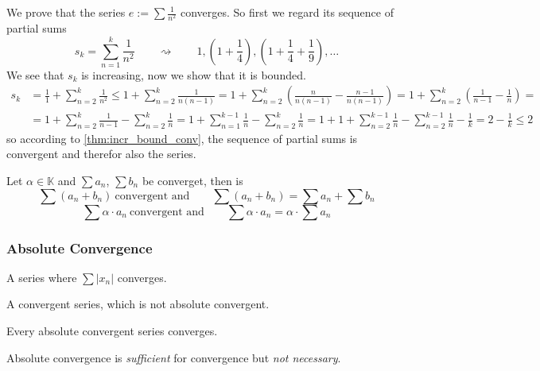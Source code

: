 \begin{example}
   We prove that the series \(e := \sum \frac{1}{n^2}\) converges.
   So first we regard its sequence of partial sums
   \[s_k = \sum_{n=1}^k \frac{1}{n^2} \qquad\rightsquigarrow\qquad 1, \left(1 + \frac{1}{4}\right),  \left(1 + \frac{1}{4} + \frac{1}{9}\right), \ldots\]
   We see that \(s_k\) is increasing, now we show that it is bounded.
   \begin{equation*}
      \begin{split}
         s_k & = \frac{1}{1} + \sum_{n=2}^k \frac{1}{n^2} \leq 1 + \sum_{n=2}^k \frac{1}{n(n-1)} = 1 + \sum_{n=2}^k \left(\frac{n}{n(n-1)} - \frac{n-1}{n(n-1)}\right) = 1 + \sum_{n=2}^k \left(\frac{1}{n-1} - \frac{1}{n}\right) = \\
             & = 1 + \sum_{n=2}^k \frac{1}{n-1} - \sum_{n=2}^k \frac{1}{n} = 1 + \sum_{n=1}^{k-1} \frac{1}{n} - \sum_{n=2}^k \frac{1}{n} = 1 + 1 + \sum_{n=2}^{k-1} \frac{1}{n} - \sum_{n=2}^{k-1}\frac{1}{n} - \frac{1}{k} = 2 - \frac{1}{k} \leq 2
      \end{split}
   \end{equation*}
   so according to \cref{thm:incr_bound_conv}, the sequence of partial sums is convergent and therefor also the series.
\end{example}

\begin{proposition}\label{pro:series_calc_rules}
   Let \(\alpha \in \mathbb{K}\) and \(\sum a_n\), \(\sum b_n\) be converget, then is
   \[\sum (a_n + b_n)~\text{convergent and} \qquad \sum (a_n + b_n) = \sum a_n + \sum b_n\]
   \[\sum \alpha \cdot a_n~\text{convergent and} \qquad \sum \alpha \cdot a_n = \alpha \cdot \sum a_n\]
\end{proposition}

\subsubsection{Absolute Convergence}
\begin{definition}
   A series where \(\sum |x_n|\) converges.
\end{definition}

\begin{definition}
   A convergent series, which is not absolute convergent.
\end{definition}

\begin{theorem}
   Every absolute convergent series converges.
\end{theorem}
\begin{remark}
   Absolute convergence is \emph{sufficient} for convergence but \emph{not necessary}.
\end{remark}

